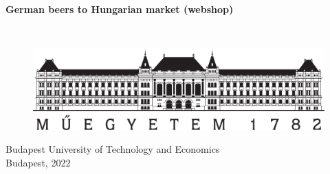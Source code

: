 
\frenchspacing
\thispagestyle{empty} %

\begin{center}
\Large{\Course} \\
\vskip 0.25cm
\large{\CourseNeptun}
\vskip 2cm

\huge{\Title}

\vskip 2cm
\Huge{\textbf{German beers to Hungarian market (webshop)}}

\vskip 3cm
\Large{\Name}\\

\mbox{}
\vfill

\begin{figure}[htb]
   \centering
   \includegraphics[width=0.7\linewidth]{pics/bme-logo.jpg}
\end{figure}


\large{Budapest University of Technology and Economics} \\
\large{Budapest, 2022}


\pagebreak
\setcounter{page}{1}

\end{center}

